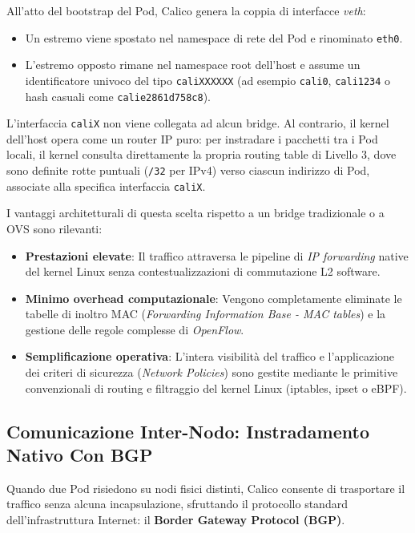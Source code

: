 \documentclass[11pt, a4paper]{article}
\begin{document}
All'atto del bootstrap del Pod, Calico genera la coppia di interfacce \emph{veth}:
\begin{itemize}[noitemsep]
    \item Un estremo viene spostato nel namespace di rete del Pod e rinominato \texttt{eth0}.
    \item L'estremo opposto rimane nel namespace root dell'host e assume un identificatore univoco del tipo \texttt{caliXXXXXX} (ad esempio \texttt{cali0}, \texttt{cali1234} o hash casuali come \texttt{calie2861d758c8}).
\end{itemize}


L'interfaccia \texttt{caliX} non viene collegata ad alcun bridge. Al contrario, il kernel dell'host opera come un router IP puro: per instradare i pacchetti tra i Pod locali, il kernel consulta direttamente la propria routing table di Livello 3, dove sono definite rotte puntuali (\texttt{/32} per IPv4) verso ciascun indirizzo di Pod, associate alla specifica interfaccia \texttt{caliX}.

I vantaggi architetturali di questa scelta rispetto a un bridge tradizionale o a OVS sono rilevanti:
\begin{itemize}[noitemsep]
    \item \textbf{Prestazioni elevate}: Il traffico attraversa le pipeline di \emph{IP forwarding} native del kernel Linux senza contestualizzazioni di commutazione L2 software.
    \item \textbf{Minimo overhead computazionale}: Vengono completamente eliminate le tabelle di inoltro MAC (\emph{Forwarding Information Base - MAC tables}) e la gestione delle regole complesse di \emph{OpenFlow}.
    \item \textbf{Semplificazione operativa}: L'intera visibilità del traffico e l'applicazione dei criteri di sicurezza (\emph{Network Policies}) sono gestite mediante le primitive convenzionali di routing e filtraggio del kernel Linux (iptables, ipset o eBPF).
\end{itemize}

\subsection{Comunicazione Inter-Nodo: Instradamento Nativo Con BGP}
Quando due Pod risiedono su nodi fisici distinti, Calico consente di trasportare il traffico senza alcuna incapsulazione, sfruttando il protocollo standard dell'infrastruttura Internet: il \textbf{Border Gateway Protocol (BGP)}.
\end{document}
